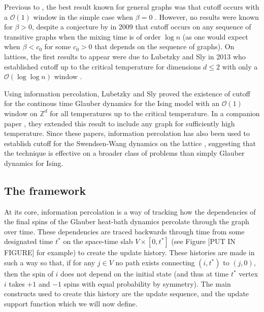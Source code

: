 	Previous to \cite{Lubetzky2016-wd}, the best result known for general graphs was that cutoff occurs with a $\mathcal{O}(1)$ window in the simple case when $\beta = 0$ \cite{Aldous1983-gz}. However, no results were known for $\beta > 0$, despite a conjecture by \citeauthor{Levin2009-fo} in 2009 \cite[Section 23.2]{Levin2009-fo} that cutoff occurs on any sequence of transitive graphs when the mixing time is of order $\log n$ (as one would expect when $\beta < c_0$ for some $c_0 > 0$ that depends on the sequence of graphs). On lattices, the first results to appear were due to Lubetzky and Sly in 2013 who established cutoff up to the critical temperature for dimensions $d \leq 2$ with only a $\mathcal{O}(\log \log n)$ window \cite{Lubetzky2013-yv}. 

	Using information percolation, Lubetzky and Sly proved the existence of cutoff for the continous time Glauber dynamics for the Ising model with an $\mathcal{O}(1)$ window on $\mathbb{Z}^d$ for all temperatures up to the critical temperature. In a companion paper \cite{Lubetzky2017-nc}, they extended this result to include any graph for sufficiently high temperature. Since these papers, information percolation has also been used to establish cutoff for the Swendsen-Wang dynamics on the lattice \cite{Nam2018-io}, suggesting that the technique is effective on a broader class of problems than simply Glauber dynamics for Ising.
	
	\subsection{The framework}
	At its core, information percolation is a way of tracking how the dependencies of the final spins of the Glauber heat-bath dynamics percolate through the graph over time. These dependencies are traced backwards through time from some designated time $t^*$ on the space-time slab $V \times [0, t^*]$ (see Figure [PUT IN FIGURE] for example) to create the update history. These histories are made in such a way so that, if for any $j \in V$ no path exists connecting $(i, t^*)$ to $(j, 0)$, then the spin of $i$ does not depend on the initial state (and thus at time $t^*$ vertex $i$ takes $+1$ and $-1$ spins with equal probability by symmetry). The main constructs used to create this history are the update sequence, and the update support function which we will now define.

